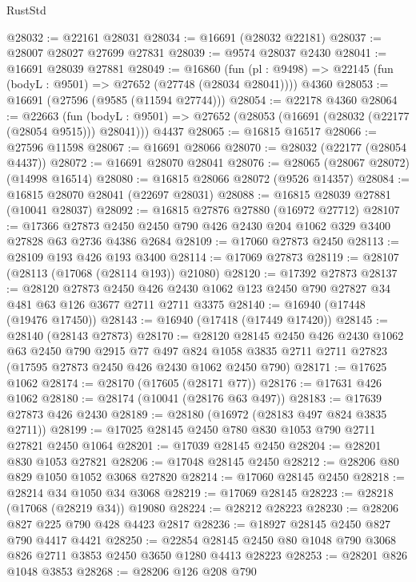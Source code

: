 \begin{lexlean}{RustStd}
\begin{coremodule}
@28032 := @22161 @28031
@28034 := @16691 (@28032 @22181)
@28037 := @28007 @28027 @27699 @27831
@28039 := @9574 @28037 @2430
@28041 := @16691 @28039 @27881
@28049 := @16860
    (fun (pl : @9498) => @22145 (fun (bodyL : @9501) => @27652 (@27748 (@28034 @28041))))
    @4360
@28053 := @16691 (@27596 (@9585 (@11594 @27744)))
@28054 := @22178 @4360
@28064 := @22663
    (fun (bodyL : @9501) => @27652 (@28053 (@16691 (@28032 (@22177 (@28054 @9515))) @28041)))
    @4437
@28065 := @16815 @16517
@28066 := @27596 @11598
@28067 := @16691 @28066
@28070 := @28032 (@22177 (@28054 @4437))
@28072 := @16691 @28070 @28041
@28076 := @28065 (@28067 @28072) (@14998 @16514)
@28080 := @16815 @28066 @28072 (@9526 @14357)
@28084 := @16815 @28070 @28041 (@22697 @28031)
@28088 := @16815 @28039 @27881 (@10041 @28037)
@28092 := @16815 @27876 @27880 (@16972 @27712)
@28107 := @17366
    @27873
    @2450
    @2450
    @790
    @426
    @2430
    @204
    @1062
    @329
    @3400
    @27828
    @63
    @2736
    @4386
    @2684
@28109 := @17060 @27873 @2450
@28113 := @28109 @193 @426 @193 @3400
@28114 := @17069 @27873
@28119 := @28107 (@28113 (@17068 (@28114 @193)) @21080)
@28120 := @17392 @27873
@28137 := @28120
    @27873
    @2450
    @426
    @2430
    @1062
    @123
    @2450
    @790
    @27827
    @34
    @481
    @63
    @126
    @3677
    @2711
    @2711
    @3375
@28140 := @16940 (@17448 (@19476 @17450))
@28143 := @16940 (@17418 (@17449 @17420))
@28145 := @28140 (@28143 @27873)
@28170 := @28120
    @28145
    @2450
    @426
    @2430
    @1062
    @63
    @2450
    @790
    @2915
    @77
    @497
    @824
    @1058
    @3835
    @2711
    @2711
    @27823
    (@17595 @27873 @2450 @426 @2430 @1062 @2450 @790)
@28171 := @17625 @1062
@28174 := @28170 (@17605 (@28171 @77))
@28176 := @17631 @426 @1062
@28180 := @28174 (@10041 (@28176 @63 @497))
@28183 := @17639 @27873 @426 @2430
@28189 := @28180 (@16972 (@28183 @497 @824 @3835 @2711))
@28199 := @17025 @28145 @2450 @780 @830 @1053 @790 @2711 @27821 @2450 @1064
@28201 := @17039 @28145 @2450
@28204 := @28201 @830 @1053 @27821
@28206 := @17048 @28145 @2450
@28212 := @28206 @80 @829 @1050 @1052 @3068 @27820
@28214 := @17060 @28145 @2450
@28218 := @28214 @34 @1050 @34 @3068
@28219 := @17069 @28145
@28223 := @28218 (@17068 (@28219 @34)) @19080
@28224 := @28212 @28223
@28230 := @28206 @827 @225 @790 @428 @4423 @2817
@28236 := @18927 @28145 @2450 @827 @790 @4417 @4421
@28250 := @22854 @28145 @2450 @80 @1048 @790 @3068 @826 @2711 @3853 @2450 @3650 @1280 @4413 @28223
@28253 := @28201 @826 @1048 @3853
@28268 := @28206
    @126
    @208
    @790

\end{coremodule}
\end{lexlean}
